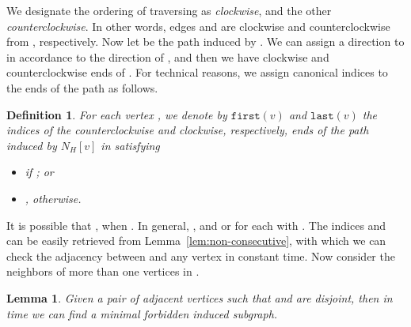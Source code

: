 \documentclass[10pt]{article}
\newtheorem{lemma}[theorem]{Lemma}
\newtheorem{definition}{Definition}
\newcommand{\badgraph}{minimal forbidden induced subgraph}
\newcommand{\hv}[1]{\ensuremath{N_H[#1]}}
\newcommand{\head}[1]{\ensuremath{{\mathtt{last}(#1)}}}
\newcommand{\tail}[1]{\ensuremath{{\mathtt{first}(#1)}}}
\begin{document}
We designate the ordering  of traversing  as
\emph{clockwise}, and the other \emph{counterclockwise}.  In other
words, edges  and  are clockwise and
counterclockwise from , respectively.  Now let  be the path
induced by .  We can assign a direction to  in accordance
to the direction of , and then we have clockwise and
counterclockwise ends of .  For technical reasons, we assign
canonical indices to the ends of the path  as follows.
\begin{definition}
  For each vertex , we denote by \tail{v} and \head{v} the
  indices of the counterclockwise and clockwise, respectively, ends of
  the path induced by \hv{v} in  satisfying
  \begin{itemize}
  \item  {if } ; or
  \item , {otherwise}.
  \end{itemize}
\end{definition}
It is possible that , when .  In
general, , and  or  for each  with .  The indices
 and  can be easily retrieved from
Lemma~\ref{lem:non-consecutive}, with which we can check the adjacency
between  and any vertex  in constant time.  Now consider
the neighbors of more than one vertices in .
\begin{lemma}\label{lem:non-consecutive-2}
  Given a pair of adjacent vertices  such that  and
   are disjoint, then in  time we can find a
  \badgraph.
\end{lemma}
\end{document}
